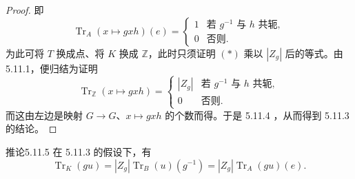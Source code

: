 \begin{proof}
即
\begin{equation}\operatorname{Tr}_A(x\longmapsto gxh)(e)=\begin{cases}1&\text{若 }g^{-1}\text{ 与 }h\text{ 共轭},\\0&\text{否则}.\end{cases}\tag{*}\end{equation}
为此可将 $T$ 换成点、将 $K$ 换成 $\mathbb Z$，此时只须证明 $(*)$ 乘以 $|Z_g|$ 后的等式。由 5.11.1，便归结为证明
\[\operatorname{Tr}_{\mathbb Z}(x\longmapsto gxh)=\begin{cases}|Z_g|&\text{若 }g^{-1}\text{ 与 }h\text{ 共轭},\\0&\text{否则}.\end{cases}\]
而这由左边是映射 $G\to G$、$x\mapsto gxh$ 的个数而得。于是 5.11.4 ，从而得到 5.11.3 的结论。
\end{proof}

\begin{SGAresult}{推论}{5.11.5}
在 5.11.3 的假设下，有
\[\operatorname{Tr}_K(gu)=|Z_g|\operatorname{Tr}_B(u)(g^{-1})=|Z_g|\operatorname{Tr}_A(gu)(e).\]
\end{SGAresult}

